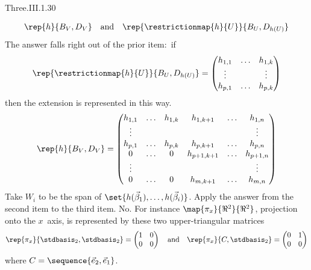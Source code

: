\begin{ans}{Three.III.1.30}
\begin{exparts}
\begin{equation*}
            \rep{h}{B_V,D_V}
            \quad\text{and}\quad
            \rep{\restrictionmap{h}{U}}{B_U,D_{h(U)}}
          \end{equation*}
          The answer falls right out of the prior item:~if
          \begin{equation*}
            \rep{\restrictionmap{h}{U}}{B_U,D_{h(U)}}
             =\begin{pmatrix}
                h_{1,1}  &\ldots  &h_{1,k}  \\
                \vdots   &        &\vdots   \\
                h_{p,1}  &\ldots  &h_{p,k}
              \end{pmatrix}
          \end{equation*}
          then the extension is represented in this way.
          \begin{equation*}
            \rep{h}{B_V,D_V}
             =\begin{pmatrix}
                h_{1,1}  &\ldots  &h_{1,k}  &h_{1,k+1}  &\ldots  &h_{1,n}  \\
                \vdots   &        &         &           &        &\vdots   \\
                h_{p,1}  &\ldots  &h_{p,k}  &h_{p,k+1}  &\ldots  &h_{p,n}  \\
                0        &\ldots  &0        &h_{p+1,k+1}&\ldots  &h_{p+1,n}  \\
                \vdots   &        &         &           &        &\vdots   \\
                0        &\ldots  &0        &h_{m,k+1}  &\ldots  &h_{m,n}
              \end{pmatrix}
          \end{equation*}
        \partsitem Take \( W_i \) to be the span of
          \( \set{h(\vec{\beta}_1),\dots,h(\vec{\beta}_i)} \).
        \partsitem Apply the answer from the second item to the third item.
        \partsitem No.
          For instance \( \map{\pi_x}{\Re^2}{\Re^2} \), projection onto
          the \( x \)~axis, is represented by these two upper-triangular
          matrices
          \begin{equation*}
             \rep{\pi_x}{\stdbasis_2,\stdbasis_2}=
             \begin{pmatrix}
               1  &0  \\
               0  &0
             \end{pmatrix}
             \quad\text{and}\quad
             \rep{\pi_x}{C,\stdbasis_2}=
             \begin{pmatrix}
               0  &1  \\
               0  &0
             \end{pmatrix}
          \end{equation*}
          where \( C=\sequence{\vec{e}_2,\vec{e}_1} \).
      \end{exparts}
    
\end{ans}
